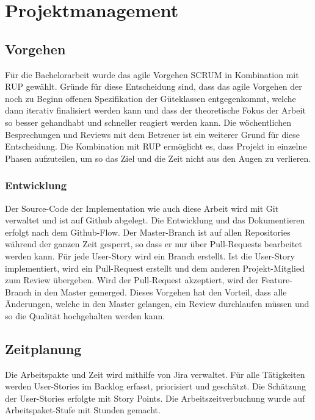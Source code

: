 
\section{Projektmanagement}
\label{Projektmanagement}

\subsection{Vorgehen}
\label{Projektmanagement:Vorgehen}

Für die Bachelorarbeit wurde das agile Vorgehen SCRUM in Kombination mit \ac{RUP} gewählt.
Gründe für diese Entscheidung sind, dass das agile Vorgehen der noch zu Beginn offenen Spezifikation der Güteklassen entgegenkommt, welche dann iterativ finalisiert werden kann und dass der theoretische Fokus der Arbeit so besser gehandhabt und schneller reagiert werden kann.
Die wöchentlichen Besprechungen und Reviews mit dem Betreuer ist ein weiterer Grund für diese Entscheidung.
Die Kombination mit \ac{RUP} ermöglicht es, dass Projekt in einzelne Phasen aufzuteilen, um so das Ziel und die Zeit nicht aus den Augen zu verlieren.


\subsubsection{Entwicklung}
\label{Vorgehen:Entwicklung}

Der Source-Code der Implementation wie auch diese Arbeit wird mit Git verwaltet und ist auf Github abgelegt.
Die Entwicklung und das Dokumentieren erfolgt nach dem Github-Flow.
Der Master-Branch ist auf allen Repositories während der ganzen Zeit gesperrt, so dass er nur über Pull-Requests bearbeitet werden kann.
Für jede User-Story wird ein Branch erstellt.
Ist die User-Story implementiert, wird ein Pull-Request erstellt und dem anderen Projekt-Mitglied zum Review übergeben.
Wird der Pull-Request akzeptiert, wird der Feature-Branch in den Master gemerged.
Dieses Vorgehen hat den Vorteil, dass alle Änderungen, welche in den Master gelangen, ein Review durchlaufen müssen und so die Qualität hochgehalten werden kann.


\subsection{Zeitplanung}
\label{Projektmanagement:Zeitplanung}

Die Arbeitspakte und Zeit wird mithilfe von Jira verwaltet.
Für alle Tätigkeiten werden User-Stories im Backlog erfasst, priorisiert und geschätzt.
Die Schätzung der User-Stories erfolgte mit Story Points.
Die Arbeitszeitverbuchung wurde auf Arbeitspaket-Stufe mit Stunden gemacht.

